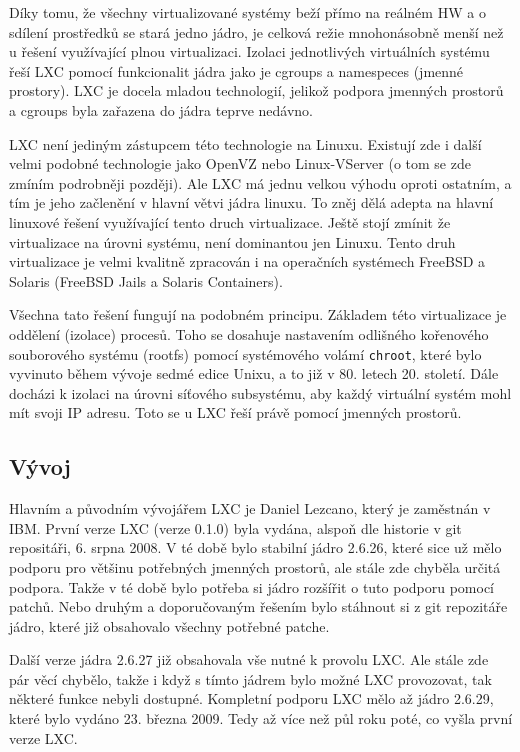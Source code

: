 Díky tomu, že všechny virtualizované systémy beží přímo na reálném HW a o sdílení prostředků se stará jedno jádro, je celková režie mnohonásobně menší než u řešení využívající plnou virtualizaci. Izolaci jednotlivých virtuálních systému řeší LXC pomocí funkcionalit jádra jako je cgroups a namespeces (jmenné prostory). LXC je docela mladou technologií, jelikož podpora jmenných prostorů a cgroups byla zařazena do jádra teprve nedávno.

LXC není jediným zástupcem této technologie na Linuxu. Existují zde i další velmi podobné technologie jako OpenVZ nebo Linux-VServer (o tom se zde zmíním podrobněji později). Ale LXC má jednu velkou výhodu oproti ostatním, a tím je jeho začlenění v hlavní větvi jádra linuxu. To zněj dělá adepta na hlavní linuxové řešení využívající tento druch virtualizace. Ještě stojí zmínit že virtualizace na úrovni systému, není dominantou jen Linuxu. Tento druh virtualizace je velmi kvalitně zpracován i na operačních systémech FreeBSD a Solaris (FreeBSD Jails a Solaris Containers).

Všechna tato řešení fungují na podobném principu. Základem této virtualizace je oddělení (izolace) procesů. Toho se dosahuje nastavením odlišného kořenového souborového systému (rootfs) pomocí systémového volámí \texttt{chroot}, které bylo vyvinuto během vývoje sedmé edice Unixu, a to již v 80. letech 20. století. Dále docházi k izolaci na úrovni síťového subsystému, aby každý virtuální systém mohl mít svoji IP adresu. Toto se u LXC řeší právě pomocí jmenných prostorů.

\subsection{Vývoj}

Hlavním a původním vývojářem LXC je Daniel Lezcano, který je zaměstnán v IBM. První verze LXC (verze 0.1.0) byla vydána, alspoň dle historie v git repositáři, 6. srpna 2008. V té době bylo stabilní jádro 2.6.26, které sice už mělo podporu pro většinu potřebných jmenných prostorů, ale stále zde chyběla určitá podpora. Takže v té době bylo potřeba si jádro rozšířit o tuto podporu pomocí patchů. Nebo druhým a doporučovaným řešením bylo stáhnout si z git repozitáře jádro, které již obsahovalo všechny potřebné patche.

Další verze jádra 2.6.27 již obsahovala vše nutné k provolu LXC. Ale stále zde pár věcí chybělo, takže i když s tímto jádrem bylo možné LXC provozovat, tak některé funkce nebyli dostupné. Kompletní podporu LXC mělo až jádro 2.6.29, které bylo vydáno 23. března 2009. Tedy až více než půl roku poté, co vyšla první verze LXC.


